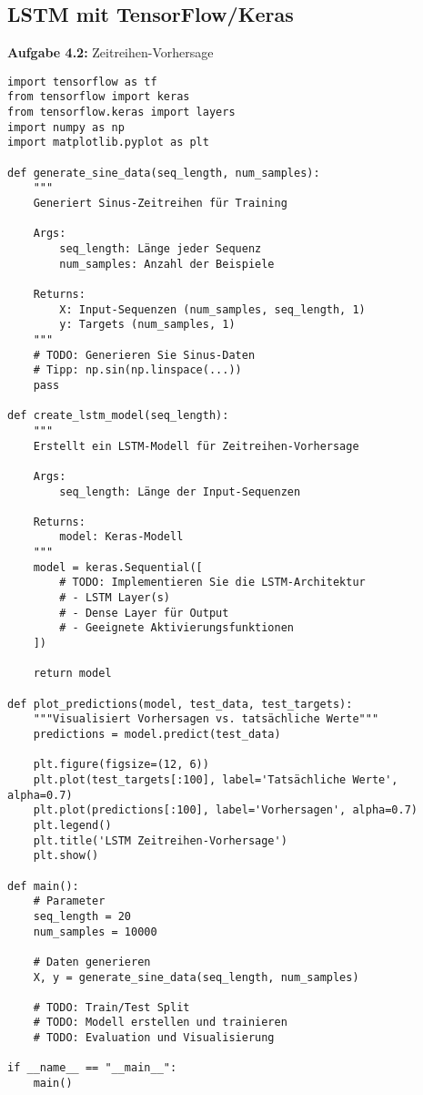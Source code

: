 \documentclass[12pt,a4paper]{article}
\begin{document}
\subsection{LSTM mit TensorFlow/Keras}

\textbf{Aufgabe 4.2:} Zeitreihen-Vorhersage

\begin{lstlisting}[caption=LSTM für Zeitreihen]
import tensorflow as tf
from tensorflow import keras
from tensorflow.keras import layers
import numpy as np
import matplotlib.pyplot as plt

def generate_sine_data(seq_length, num_samples):
    """
    Generiert Sinus-Zeitreihen für Training
    
    Args:
        seq_length: Länge jeder Sequenz
        num_samples: Anzahl der Beispiele
    
    Returns:
        X: Input-Sequenzen (num_samples, seq_length, 1)
        y: Targets (num_samples, 1)
    """
    # TODO: Generieren Sie Sinus-Daten
    # Tipp: np.sin(np.linspace(...))
    pass

def create_lstm_model(seq_length):
    """
    Erstellt ein LSTM-Modell für Zeitreihen-Vorhersage
    
    Args:
        seq_length: Länge der Input-Sequenzen
    
    Returns:
        model: Keras-Modell
    """
    model = keras.Sequential([
        # TODO: Implementieren Sie die LSTM-Architektur
        # - LSTM Layer(s)
        # - Dense Layer für Output
        # - Geeignete Aktivierungsfunktionen
    ])
    
    return model

def plot_predictions(model, test_data, test_targets):
    """Visualisiert Vorhersagen vs. tatsächliche Werte"""
    predictions = model.predict(test_data)
    
    plt.figure(figsize=(12, 6))
    plt.plot(test_targets[:100], label='Tatsächliche Werte', alpha=0.7)
    plt.plot(predictions[:100], label='Vorhersagen', alpha=0.7)
    plt.legend()
    plt.title('LSTM Zeitreihen-Vorhersage')
    plt.show()

def main():
    # Parameter
    seq_length = 20
    num_samples = 10000
    
    # Daten generieren
    X, y = generate_sine_data(seq_length, num_samples)
    
    # TODO: Train/Test Split
    # TODO: Modell erstellen und trainieren
    # TODO: Evaluation und Visualisierung

if __name__ == "__main__":
    main()
\end{lstlisting}
\end{document}
